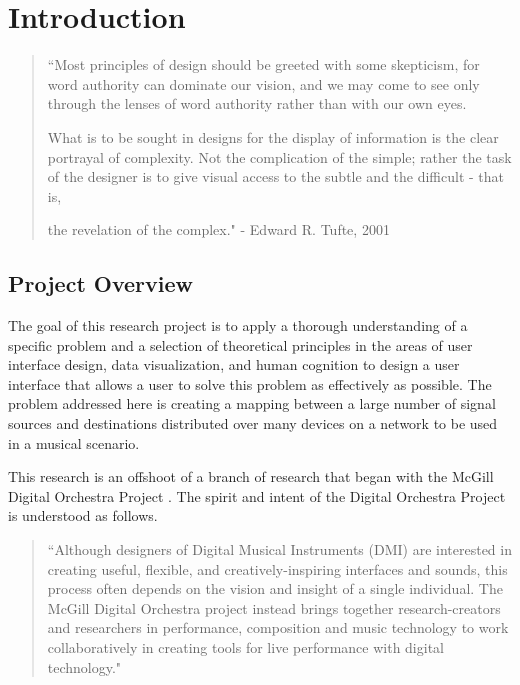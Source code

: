 \resetdatestamp

\chapter{Introduction}

\begin{quote}
``Most principles of design should be greeted with some skepticism, for word authority can dominate our vision, and we may come to see only through the lenses of word authority rather than with our own eyes.

What is to be sought in designs for the display of information is the clear portrayal of complexity. Not the complication of the simple; rather the task of the designer is to give visual access to the subtle and the difficult - that is,

the revelation of the complex." - Edward R. Tufte, 2001 \cite{tuft2001}
\end{quote}

\section{Project Overview}

The goal of this research project is to apply a thorough understanding of a specific problem and a selection of theoretical principles in the areas of user interface design, data visualization, and human cognition to design a user interface that allows a user to solve this problem as effectively as possible. The problem addressed here is creating a mapping between a large number of signal sources and destinations distributed over many devices on a network to be used in a musical scenario. 

This research is an offshoot of a branch of research that began with the McGill Digital Orchestra Project \cite{orchestra2010}. The spirit and intent of the Digital Orchestra Project is understood as follows.

\begin{quote}
``Although designers of Digital Musical Instruments (DMI) are interested in creating useful, flexible, and creatively-inspiring interfaces and sounds, this process often depends on the vision and insight of a single individual. The McGill Digital Orchestra project instead brings together research-creators and researchers in performance, composition and music technology to work collaboratively in creating tools for live performance with digital technology." \cite{Malloch2007}
\end{quote}

